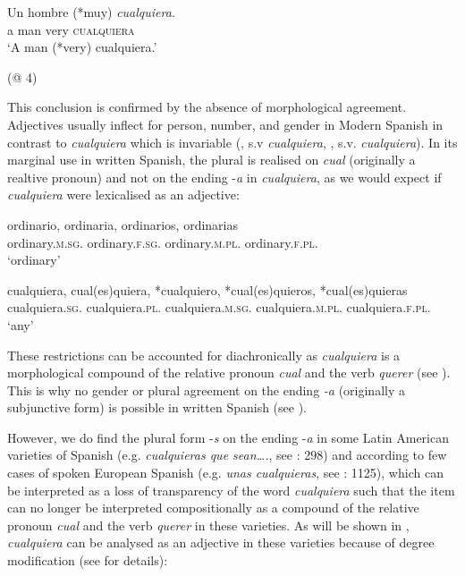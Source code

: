 \ea \label{ex:key:47} %
  \gll Un hombre (*muy) \textit{cualquiera}.\\
a man {  very} \textsc{cualquiera}\\
  \glt ‘A man (*very) cualquiera.’

  (@ 4)
\z

This conclusion is confirmed by the absence of morphological agreement. Adjectives usually inflect for person, number, and gender in Modern Spanish in contrast to \textit{cualquiera} which is invariable (\citealt{Seco1986}, s.v \textit{cualquiera}, \citealt{Rainer1993}, s.v. \textit{cualquiera}). In its marginal use in written Spanish, the plural is realised on \textit{cual} (originally a realtive pronoun) and not on the ending -\textit{a} in \textit{cualquiera}, as we would expect if \textit{cualquiera} were lexicalised as an adjective:

\ea \label{ex:key:48} %
  \gll ordinario, ordinaria, ordinarios, ordinarias\\
  ordinary.\textsc{m.sg.} ordinary.\textsc{f.sg}. ordinary.\textsc{m.pl}. ordinary.\textsc{f.pl.}\\
  \glt ‘ordinary’
\z 

\ea \label{ex:key:49} %
  \gll cualquiera, cual(es)quiera, *cualquiero, *cual(es)quieros, *cual(es)quieras\\
  cualquiera.\textsc{sg}. cualquiera.\textsc{pl}. { cualquiera.\textsc{m.sg}}. { cualquiera.\textsc{m.pl.}} { cualquiera.\textsc{f.pl.}}\\
  \glt ‘any’
\z

These restrictions can be accounted for diachronically as \textit{cualquiera} is a morphological compound of the relative pronoun \textit{cual} and the verb \textit{querer} (see ). This is why no gender or plural agreement on the ending \textit{{}-a} (originally a subjunctive form) is possible in written Spanish (see ).

However, we do find the plural form -\textit{s} on the ending -\textit{a} in some Latin American varieties of Spanish (e.g. \textit{cualquieras que sean….}, see \citealt{Rainer1993}: 298) and according to \citet{cp2009} few cases of spoken European Spanish (e.g. \textit{unas cualquieras}, see \citealt{cp2009}: 1125), which can be interpreted as a loss of transparency of the word \textit{cualquiera} such that the item can no longer be interpreted compositionally as a compound of the relative pronoun \textit{cual} and the verb \textit{querer} in these varieties. As will be shown in , \textit{cualquiera} can be analysed as an adjective in these varieties because of degree modification (see  for details):

